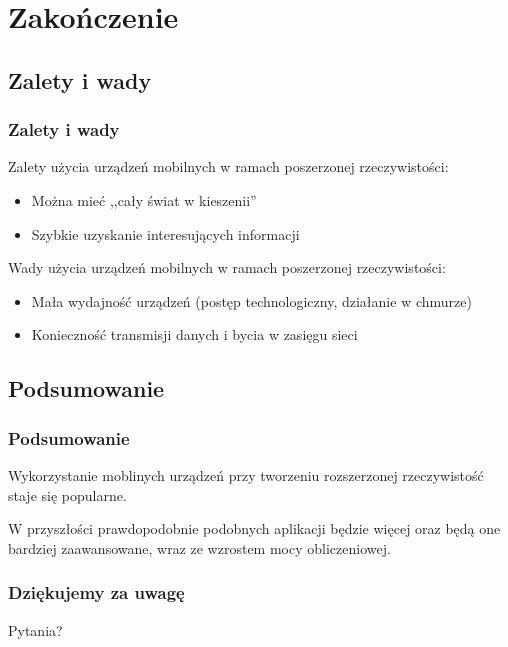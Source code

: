 \section{Zakończenie}
\nextoc
\subsection{Zalety i wady}
\begin{frame}
    \frametitle{Zalety i wady}
    Zalety użycia urządzeń mobilnych w ramach poszerzonej rzeczywistości:
    \begin{itemize}
        \item Można mieć ,,cały świat w kieszenii''
        \item Szybkie uzyskanie interesujących informacji
    \end{itemize}
    Wady użycia urządzeń mobilnych w ramach poszerzonej rzeczywistości:
    \begin{itemize}
        \item Mała wydajność urządzeń (postęp technologiczny, działanie w chmurze)
        \item Konieczność transmisji danych i bycia w zasięgu sieci
    \end{itemize}
\end{frame}

\subsection{Podsumowanie}
\begin{frame}
    \frametitle{Podsumowanie}
    Wykorzystanie moblinych urządzeń przy tworzeniu rozszerzonej rzeczywistość staje się popularne.

    W przyszłości prawdopodobnie podobnych aplikacji będzie więcej oraz będą one bardziej zaawansowane, wraz ze wzrostem mocy obliczeniowej.
\end{frame}

\begin{frame}
    \frametitle{Dziękujemy za uwagę}
    \begin{center}
        Pytania?
    \end{center}
\end{frame}
